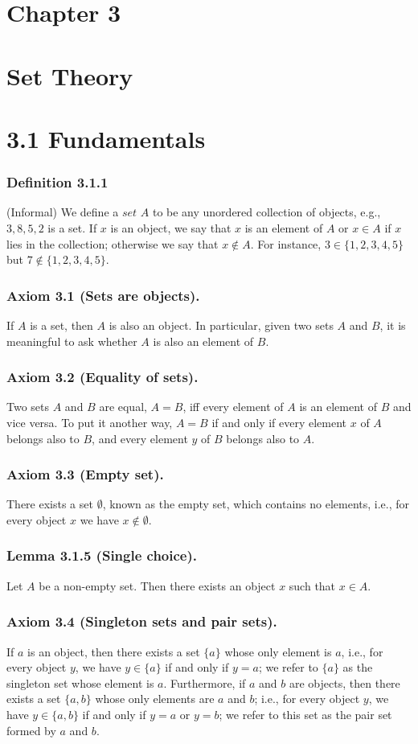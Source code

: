 \documentclass[12pt, letter]{article}
\begin{document}
\section*{Chapter 3}
\section*{Set Theory}
\section*{3.1 Fundamentals}
\subsubsection*{Definition 3.1.1}
(Informal) We define a $set$ $A$ to be any unordered collection of objects, e.g., ${3,8,5,2}$ is a set. If $x$ is an object, we say that $x$ is an element of $A$ or $x\in A$ if $x$ lies in the collection;
otherwise we say that $x\notin A$. For instance, $3\in\{1,2,3,4,5\}$ but $7\notin \{1,2,3,4,5\}$.
\subsubsection*{Axiom 3.1 (Sets are objects).} 
If $A$ is a set, then $A$ is also an object. In particular, given two sets $A$ and $B$, it is meaningful to ask whether $A$ is also an element of $B$.
\subsubsection*{Axiom 3.2 (Equality of sets).}
Two sets $A$ and $B$ are equal, $A=B$, iff every element of $A$ is an element of $B$ and vice versa. To put it another way, $A=B$ if and only if every element $x$ of $A$ belongs also to $B$, and every element $y$
of $B$ belongs also to $A$.
\subsubsection*{Axiom 3.3 (Empty set).}
There exists a set $\emptyset$, known as the empty set, which contains no elements, i.e., for every object $x$ we have $x\notin\emptyset$. 
\subsubsection*{Lemma 3.1.5 (Single choice).}
Let $A$ be a non-empty set. Then there exists an object $x$ such that $x\in A$. 
\subsubsection*{Axiom 3.4 (Singleton sets and pair sets).}
If $a$ is an object, then there exists a set $\{a\}$ whose only element is $a$, i.e., for every object $y$, we have $y\in\{a\}$ if and only if $y=a$; we refer to $\{a\}$ as the singleton set 
whose element is $a$. Furthermore, if $a$ and $b$ are objects, then there exists a set $\{a, b\}$ whose only elements are $a$ and $b$; i.e., for every object $y$, we have $y\in\{a,b\}$ if and only if $y=a$ or $y=b$; 
we refer to this set as the pair set formed by $a$ and $b$.
\end{document}
